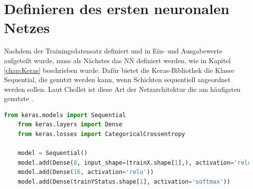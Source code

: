 \section{Definieren des ersten neuronalen Netzes}
\label{chap:DefineNN}
Nachdem der Trainingsdatensatz definiert und in Ein- und Ausgabewerte aufgeteilt wurde, muss als Nächstes das \ac{NN} definiert werden, wie in Kapitel \ref{chap:Keras} beschrieben wurde.
Dafür bietet die Keras-Bibliothek die Klasse \glqq Sequential\grqq{}, die genutzt werden kann, wenn Schichten sequentiell angeordnet werden sollen. Laut Chollet ist diese Art der 
Netzarchitektur die am häufigsten genutzte \cite[vgl. S.92]{DL_PY}. 

\begin{lstlisting}[language = python, caption={Erstellung eines sequentiellen Modells},captionpos=b, label = lst:ModellSeq, floatplacement=H]
    from keras.models import Sequential
    from keras.layers import Dense
    from keras.losses import CategoricalCrossentropy 

    model = Sequential()
    model.add(Dense(8, input_shape=(trainX.shape[1],), activation='relu'))
    model.add(Dense(16, activation='relu'))
    model.add(Dense(trainYStatus.shape[1], activation='softmax'))
\end{lstlisting}

